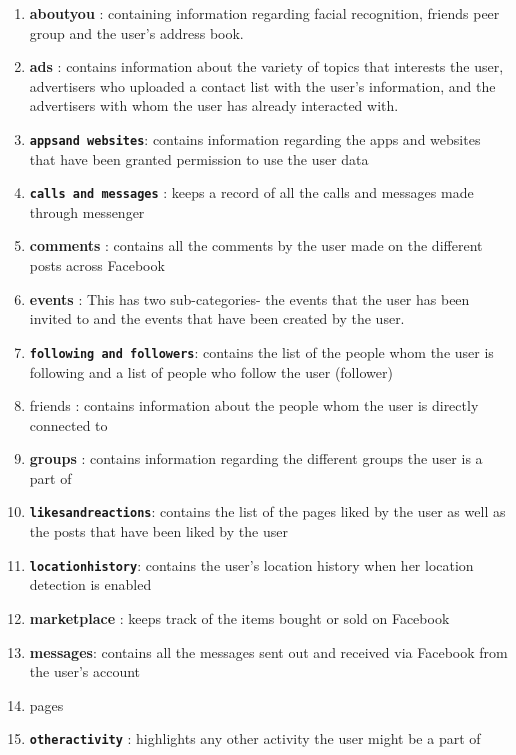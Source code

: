  \begin{enumerate}[i]
   \item \textbf{about\textunderscore you }: containing information regarding facial recognition, friends peer group and the user's address book.
   \item \textbf{ads} : contains information about the variety of topics that interests the user, advertisers who uploaded a contact list with the user's information, and the advertisers with whom the user has already interacted with.
   \item \textbf{\texttt{apps\textunderscore and \textunderscore websites}}: contains information regarding the apps and websites that have been granted permission to use the user data
   \item \textbf{\texttt{calls \textunderscore and \textunderscore messages}} : keeps a record of all the calls and messages made through messenger
   \item \textbf{comments} : contains all the comments by the user made on the different posts across Facebook
   \item \textbf{events} : This has two sub-categories- the events that the user has been invited to and the events that have been created by the user.
   \item \textbf{\texttt{following \textunderscore and \textunderscore followers}}: contains the list of the people whom the user is following and a list of people who follow the user (follower)
   \item friends : contains information about the people whom the user is directly connected to
   \item \textbf{groups} : contains information regarding the different groups the user is a part of
   \item \textbf{\texttt{likes\textunderscore and\textunderscore reactions}}: contains the list of the pages liked by the user as well as the posts that have been liked by the user
   \item \textbf{\texttt{location\textunderscore history}}: contains the user's location history when her location detection is enabled
   \item \textbf{marketplace} : keeps track of the items bought or sold on Facebook
   \item \textbf{messages}: contains all the messages sent out and received via Facebook from the user's account
   \item pages
   \item \textbf{\texttt{other\textunderscore activity}} : highlights any other activity the user might be a part of

\end{enumerate}
